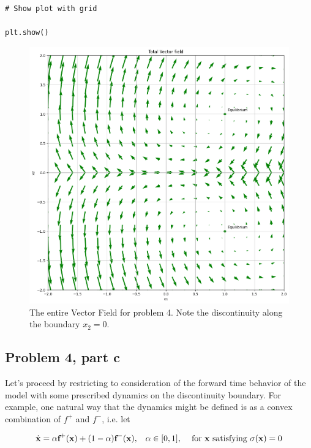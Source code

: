 \begin{solution}
\begin{lstlisting}
# Show plot with grid 
 
plt.show() 
\end{lstlisting}


\jump
\begin{figure}[!ht]
\centering
\includegraphics[scale = 0.6]{Images/vector field for system.png}
\caption{The entire Vector Field for problem 4. Note the discontinuity along the boundary $x_2 = 0$.}
\label{png:vectorfield}
\end{figure}
\end{solution}

\vspace{\floatsep}
\clearpage

\subsection{Problem 4, part c}

Let’s proceed by restricting to consideration of the forward time behavior of the model with some prescribed dynamics on the discontinuity boundary. For example, one natural way that the dynamics might be defined is as a convex combination of $f^+$ and $f^-$, i.e. let

\[
\dot{\textbf{x}} = \alpha\textbf{f}^+(\textbf{x}) + (1 - \alpha)\textbf{f}^-(\textbf{x}), \hspace{3mm} \alpha \in [0, 1], \hspace{3mm} \text{ for \textbf{x} satisfying $\sigma(\textbf{x}) = 0$}
\]


